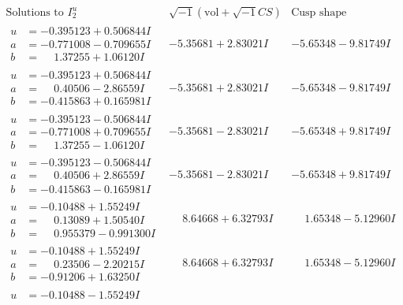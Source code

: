 \documentclass[1p]{elsarticle_modified}
\theoremstyle{definition}
\newcommand{\I}{\sqrt{-1}}
\begin{document}
$$\begin{array}{c|c|c}  
\text{Solutions to }I^u_{2}& \I (\text{vol} + \sqrt{-1}CS) & \text{Cusp shape}\\
 \hline 
\begin{aligned}
u &= -0.395123 + 0.506844 I \\
a &= -0.771008 - 0.709655 I \\
b &= \phantom{-}1.37255 + 1.06120 I\end{aligned}
 & -5.35681 + 2.83021 I & -5.65348 - 9.81749 I \\ \hline\begin{aligned}
u &= -0.395123 + 0.506844 I \\
a &= \phantom{-}0.40506 - 2.86559 I \\
b &= -0.415863 + 0.165981 I\end{aligned}
 & -5.35681 + 2.83021 I & -5.65348 - 9.81749 I \\ \hline\begin{aligned}
u &= -0.395123 - 0.506844 I \\
a &= -0.771008 + 0.709655 I \\
b &= \phantom{-}1.37255 - 1.06120 I\end{aligned}
 & -5.35681 - 2.83021 I & -5.65348 + 9.81749 I \\ \hline\begin{aligned}
u &= -0.395123 - 0.506844 I \\
a &= \phantom{-}0.40506 + 2.86559 I \\
b &= -0.415863 - 0.165981 I\end{aligned}
 & -5.35681 - 2.83021 I & -5.65348 + 9.81749 I \\ \hline\begin{aligned}
u &= -0.10488 + 1.55249 I \\
a &= \phantom{-}0.13089 + 1.50540 I \\
b &= \phantom{-}0.955379 - 0.991300 I\end{aligned}
 & \phantom{-}8.64668 + 6.32793 I & \phantom{-}1.65348 - 5.12960 I \\ \hline\begin{aligned}
u &= -0.10488 + 1.55249 I \\
a &= \phantom{-}0.23506 - 2.20215 I \\
b &= -0.91206 + 1.63250 I\end{aligned}
 & \phantom{-}8.64668 + 6.32793 I & \phantom{-}1.65348 - 5.12960 I \\ \hline\begin{aligned}
u &= -0.10488 - 1.55249 I \\

\end{aligned}
\end{array}$$
\end{document}
